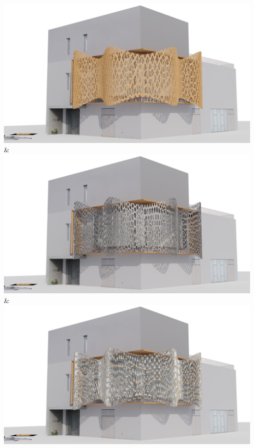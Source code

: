 \documentclass[final,5p,times]{elsarticle}%
\begin{document}
\begin{linenumbers}
\begin{table}[htb]
\begin{tabularx}
              {\includegraphics[width=1\linewidth]{Images/Pattern 1/0009}} &
              {\includegraphics[width=1\linewidth]{Images/Pattern 2/0009}} &
              {\includegraphics[width=1\linewidth]{Images/Pattern 3/0009}} \\
            \bottomrule
        \end{tabularx}
    \end{table}



\end{linenumbers}
\end{document}
